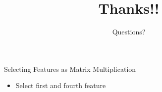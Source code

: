 \documentclass[aspectratio=169,14pt,usenames,dvipsnames]{beamer}
\begin{document}
\begin{frame}{Selecting Features as Matrix Multiplication}
\begin{itemize}
		\vspace{-0.18cm}	
	\item<4-> {\small{Select first and fourth feature}}     
\end{itemize}
\end{frame}


{ \1
\begin{frame}
	\title{Thanks!!}
	\subtitle{Questions?}
	\maketitle
\end{frame}
}
\end{document}
